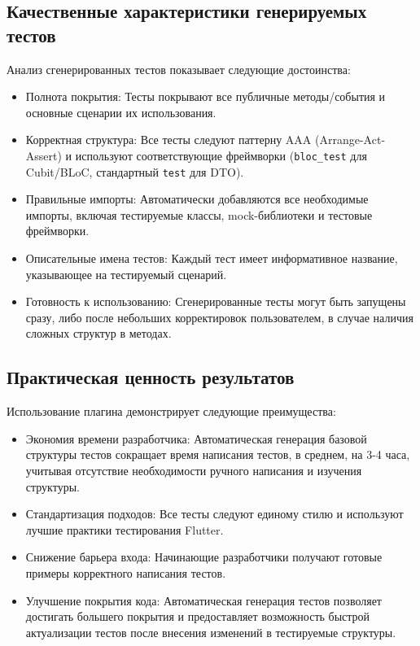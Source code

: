 \documentclass[14pt, russian]{scrartcl}
\begin{document}
\subsection{Качественные характеристики генерируемых тестов}

Анализ сгенерированных тестов показывает следующие достоинства:

\begin{itemize}
    \item Полнота покрытия: Тесты покрывают все публичные методы/события и основные сценарии их использования.
    \item Корректная структура: Все тесты следуют паттерну AAA (Arrange-Act-Assert) и используют соответствующие фреймворки (\texttt{bloc\_test} для Cubit/BLoC, стандартный \texttt{test} для DTO).
    \item Правильные импорты: Автоматически добавляются все необходимые импорты, включая тестируемые классы, mock-библиотеки и тестовые фреймворки.
    \item Описательные имена тестов: Каждый тест имеет информативное название, указывающее на тестируемый сценарий.
    \item Готовность к использованию: Сгенерированные тесты могут быть запущены сразу, либо после небольших корректировок пользователем, в случае наличия сложных структур в методах.
\end{itemize}

\subsection{Практическая ценность результатов}

Использование плагина демонстрирует следующие преимущества:

\begin{itemize}
    \item Экономия времени разработчика: Автоматическая генерация базовой структуры тестов сокращает время написания тестов, в среднем, на 3-4 часа, учитывая отсутствие необходимости ручного написания и изучения структуры.
    \item Стандартизация подходов: Все тесты следуют единому стилю и используют лучшие практики тестирования Flutter.
    \item Снижение барьера входа: Начинающие разработчики получают готовые примеры корректного написания тестов.
    \item Улучшение покрытия кода: Автоматическая генерация тестов позволяет достигать большего покрытия и предоставляет возможность быстрой актуализации тестов после внесения изменений в тестируемые структуры.
\end{itemize}
\end{document}
